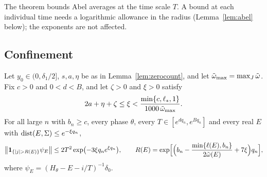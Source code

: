 The theorem bounds Abel averages at the time scale $T$. A bound at each individual time needs a logarithmic allowance in the radius (Lemma~\ref{lem:abel} below); the exponents are not affected.

\subsection{Confinement}

\begin{proposition}\label{prop:Comega}
Let $y_0\in(0,\delta_1/2]$, $s,a,\eta$ be as in Lemma~\ref{lem:zerocount}, and let $\tilde\omega_{\max}=\max_J\tilde\omega$. Fix $c>0$ and $0<d<B$, and let $\zeta>0$ and $\xi>0$ satisfy
\[
2a+\eta+\zeta\le\xi<\frac{\min\{c,\ell_*,1\}}{1000\,\tilde\omega_{\max}} .
\]
For all large $n$ with $b_n\ge c$, every phase $\theta$, every $T\in[e^{dq_n},e^{Bq_n}]$ and every real $E$ with $\operatorname{dist}(E,\Sigma)\le e^{-\xi q_n}$,
\[
\bigl\|\un_{\{|j|>R(E)\}}\psi_E\bigr\|\le2T^2\exp\bigl(-3\xi q_ne^{\xi q_n}\bigr),\qquad R(E)=\exp\Bigl[\Bigl(b_n-\frac{\min\{\ell(E),b_n\}}{2\omt(E)}+7\xi\Bigr)q_n\Bigr],
\]
where $\psi_E=(H_\theta-E-i/T)^{-1}\delta_0$.
\end{proposition}

